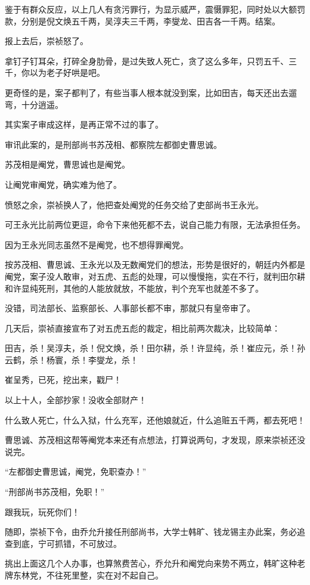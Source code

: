 \begin{multicols}{\theparacolNo}
鉴于有群众反应，以上几人有贪污罪行，为显示威严，震慑罪犯，同时处以大额罚款，分别是倪文焕五千两，吴淳夫三千两，李燮龙、田吉各一千两。结案。

报上去后，崇祯怒了。

拿钉子钉耳朵，打碎全身肋骨，是过失致人死亡，贪了这么多年，只罚五千、三千，你以为老子好哄是吧。

更奇怪的是，案子都判了，有些当事人根本就没到案，比如田吉，每天还出去遛弯，十分逍遥。

其实案子审成这样，是再正常不过的事了。

审讯此案的，是刑部尚书苏茂相、都察院左都御史曹思诚。

苏茂相是阉党，曹思诚也是阉党。

让阉党审阉党，确实难为他了。

愤怒之余，崇祯换人了，他把查处阉党的任务交给了吏部尚书王永光。

可王永光比前两位更逗，命令下来他死都不去，说自己能力有限，无法承担任务。

因为王永光同志虽然不是阉党，也不想得罪阉党。

按苏茂相、曹思诚、王永光以及无数阉党们的想法，形势是很好的，朝廷内外都是阉党，案子没人敢审，对五虎、五彪的处理，可以慢慢拖，实在不行，就判田尔耕和许显纯死刑，其他的人能放就放，不能放，判个充军也就差不多了。

没错，司法部长、监察部长、人事部长都不审，那就只有皇帝审了。

几天后，崇祯直接宣布了对五虎五彪的裁定，相比前两次裁决，比较简单：

田吉，杀！吴淳夫，杀！倪文焕，杀！田尔耕，杀！许显纯，杀！崔应元，杀！孙云鹤，杀！杨寰，杀！李燮龙，杀！

崔呈秀，已死，挖出来，戳尸！

以上十人，全部抄家！没收全部财产！

什么致人死亡，什么入狱，什么充军，还他娘就近，什么追赃五千两，都去死吧！

曹思诚、苏茂相这帮等阉党本来还有点想法，打算说两句，才发现，原来崇祯还没说完。

“左都御史曹思诚，阉党，免职查办！”

“刑部尚书苏茂相，免职！”

跟我玩，玩死你们！

随即，崇祯下令，由乔允升接任刑部尚书，大学士韩旷、钱龙锡主办此案，务必追查到底，宁可抓错，不可放过。

挑出上面这几个人办事，也算煞费苦心，乔允升和阉党向来势不两立，韩旷这种老牌东林党，不往死里整，实在对不起自己。


\end{multicols}
